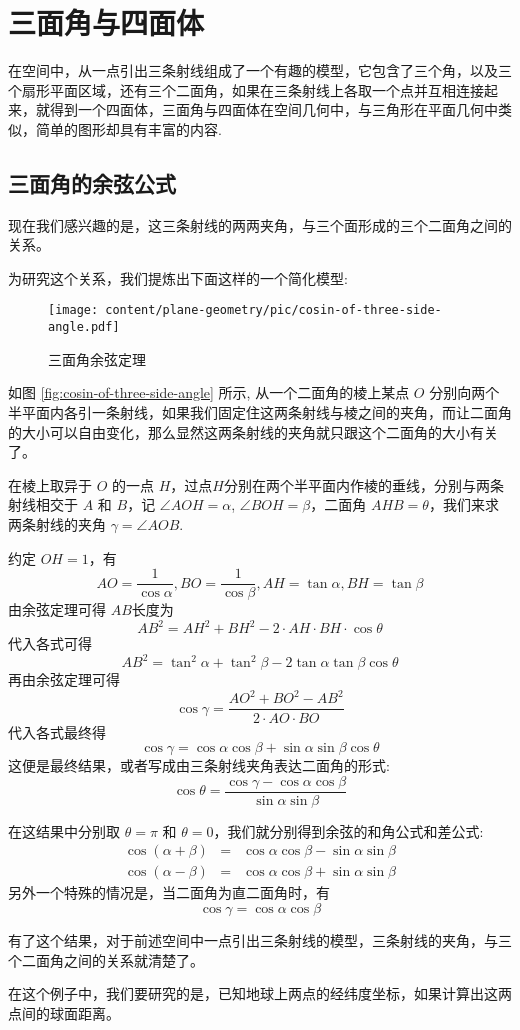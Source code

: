 
\section{三面角与四面体}
\label{sec:trihedral-angle}

在空间中，从一点引出三条射线组成了一个有趣的模型，它包含了三个角，以及三个扇形平面区域，还有三个二面角，如果在三条射线上各取一个点并互相连接起来，就得到一个四面体，三面角与四面体在空间几何中，与三角形在平面几何中类似，简单的图形却具有丰富的内容.

\subsection{三面角的余弦公式}
\label{sec:cosin-of-three-side-angle}


现在我们感兴趣的是，这三条射线的两两夹角，与三个面形成的三个二面角之间的关系。

为研究这个关系，我们提炼出下面这样的一个简化模型:


\begin{figure}[htbp]
\centering
\texttt{[image: content/plane-geometry/pic/cosin-of-three-side-angle.pdf]}
\caption{三面角余弦定理}
\label{fig:cosin-of-three-side-angle}
\end{figure}

如图 \autoref{fig:cosin-of-three-side-angle} 所示, 从一个二面角的棱上某点 $O$ 分别向两个半平面内各引一条射线，如果我们固定住这两条射线与棱之间的夹角，而让二面角的大小可以自由变化，那么显然这两条射线的夹角就只跟这个二面角的大小有关了。

在棱上取异于 $O$ 的一点 $H$，过点$H$分别在两个半平面内作棱的垂线，分别与两条射线相交于 $A$ 和 $B$，记 $\angle AOH = \alpha$, $\angle BOH=\beta$，二面角 $AHB=\theta$，我们来求 两条射线的夹角 $\gamma = \angle AOB$.

约定 $OH = 1$，有
\[ AO = \frac{1}{\cos{\alpha}}, BO = \frac{1}{\cos{\beta}}, AH = \tan{\alpha}, BH = \tan{\beta} \]
由余弦定理可得 $AB$长度为
\[ AB^{2} = AH^2+BH^2-2 \cdot AH \cdot BH \cdot \cos{\theta} \]
代入各式可得
\[ AB^2 = \tan^2{\alpha} + \tan^2{\beta} - 2 \tan{\alpha} \tan{\beta} \cos{\theta} \]
再由余弦定理可得
\[ \cos{\gamma} = \frac{AO^2+BO^2-AB^2}{2 \cdot AO \cdot BO} \]
代入各式最终得
\[ \cos{\gamma} = \cos{\alpha}\cos{\beta}+\sin{\alpha}\sin{\beta}\cos{\theta} \]
这便是最终结果，或者写成由三条射线夹角表达二面角的形式:
\[ \cos{\theta} = \frac{\cos{\gamma}-\cos{\alpha}\cos{\beta}}{\sin{\alpha}\sin{\beta}} \]

在这结果中分别取 $\theta = \pi$ 和 $\theta = 0$，我们就分别得到余弦的和角公式和差公式:
\begin{eqnarray*}
  \cos{(\alpha+\beta)} & = & \cos{\alpha}\cos{\beta} - \sin{\alpha}\sin{\beta} \\
  \cos{(\alpha-\beta)} & = & \cos{\alpha}\cos{\beta} + \sin{\alpha}\sin{\beta} 
\end{eqnarray*}
另外一个特殊的情况是，当二面角为直二面角时，有
\[ \cos{\gamma} = \cos{\alpha}\cos{\beta} \]

有了这个结果，对于前述空间中一点引出三条射线的模型，三条射线的夹角，与三个二面角之间的关系就清楚了。

\begin{example}[根据经纬度计算地球上两点间的(球面)距离]
  在这个例子中，我们要研究的是，已知地球上两点的经纬度坐标，如果计算出这两点间的球面距离。
\end{example}


